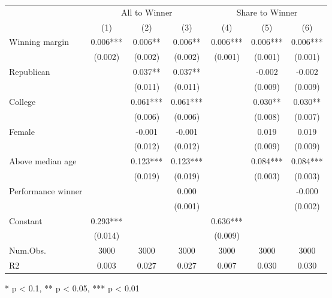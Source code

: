 \begin{table}[t]
\fontsize{12.0pt}{14.4pt}\selectfont
\begin{tabular*}{\linewidth}{@{\extracolsep{\fill}}lcccccc}
\toprule
 & \multicolumn{3}{c}{All to Winner} & \multicolumn{3}{c}{Share to Winner} \\ 
\cmidrule(lr){2-4} \cmidrule(lr){5-7}
  & (1) & (2) & (3) & (4) & (5) & (6) \\ 
\midrule\addlinespace[2.5pt]
Winning margin & 0.006*** & 0.006** & 0.006** & 0.006*** & 0.006*** & 0.006*** \\ 
 & (0.002) & (0.002) & (0.002) & (0.001) & (0.001) & (0.001) \\ 
Republican &  & 0.037** & 0.037** &  & -0.002 & -0.002 \\ 
 &  & (0.011) & (0.011) &  & (0.009) & (0.009) \\ 
College &  & 0.061*** & 0.061*** &  & 0.030** & 0.030** \\ 
 &  & (0.006) & (0.006) &  & (0.008) & (0.007) \\ 
Female &  & -0.001 & -0.001 &  & 0.019 & 0.019 \\ 
 &  & (0.012) & (0.012) &  & (0.009) & (0.009) \\ 
Above median age &  & 0.123*** & 0.123*** &  & 0.084*** & 0.084*** \\ 
 &  & (0.019) & (0.019) &  & (0.003) & (0.003) \\ 
Performance winner &  &  & 0.000 &  &  & -0.000 \\ 
 &  &  & (0.001) &  &  & (0.002) \\ 
Constant & 0.293*** &  &  & 0.636*** &  &  \\ 
{} & {(0.014)} & {} & {} & {(0.009)} & {} & {} \\ 
Num.Obs. & 3000 & 3000 & 3000 & 3000 & 3000 & 3000 \\ 
R2 & 0.003 & 0.027 & 0.027 & 0.007 & 0.030 & 0.030 \\ 
\bottomrule
\end{tabular*}
\begin{minipage}{\linewidth}
* p < 0.1, ** p < 0.05, *** p < 0.01\\
\end{minipage}
\end{table}

